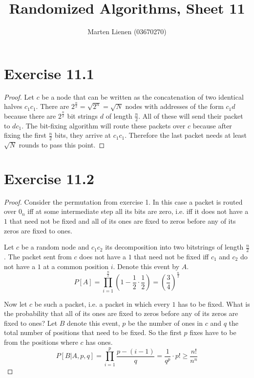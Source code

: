 \documentclass[10pt,a4paper]{article}
\title{Randomized Algorithms, Sheet 11}
\author{Marten Lienen (03670270)}
\begin{document}
\maketitle

\section*{Exercise 11.1}

\begin{proof}
  Let $c$ be a node that can be written as the concatenation of two identical halves $c_{1}c_{1}$.
  There are $2^{\frac{n}{2}} = \sqrt{2^{n}} = \sqrt{N}$ nodes with addresses of the form $c_{1}d$ because there are $2^{\frac{n}{2}}$ bit strings $d$ of length $\frac{n}{2}$.
  All of these will send their packet to $dc_{1}$.
  The bit-fixing algorithm will route these packets over $c$ because after fixing the first $\frac{n}{2}$ bits, they arrive at $c_{1}c_{1}$.
  Therefore the last packet needs at least $\sqrt{N}$ rounds to pass this point.
\end{proof}

\section*{Exercise 11.2}

\begin{proof}
  Consider the permutation from exercise 1.
  In this case a packet is routed over $0_{n}$ iff at some intermediate step all its bits are zero, i.e. iff it does not have a $1$ that need not be fixed and all of its ones are fixed to zeros before any of its zeros are fixed to ones.

  Let $c$ be a random node and $c_{1}c_{2}$ its decomposition into two bitstrings of length $\frac{n}{2}$.
  The packet sent from $c$ does not have a $1$ that need not be fixed iff $c_{1}$ and $c_{2}$ do not have a $1$ at a common position $i$.
  Denote this event by $A$.
  \begin{equation*}
    P[A] = \prod_{i = 1}^{\frac{n}{2}} \left( 1 - \frac{1}{2} \cdot \frac{1}{2} \right) = \left( \frac{3}{4} \right)^{\frac{n}{2}}
  \end{equation*}

  Now let $c$ be such a packet, i.e. a packet in which every $1$ has to be fixed.
  What is the probability that all of its ones are fixed to zeros before any of its zeros are fixed to ones?
  Let $B$ denote this event, $p$ be the number of ones in $c$ and $q$ the total number of positions that need to be fixed.
  So the first $p$ fixes have to be from the positions where $c$ has ones.
  \begin{equation*}
    P[B | A, p, q] = \prod_{i = 1}^{p} \frac{p - (i - 1)}{q} = \frac{1}{q^{p}} \cdot p! \ge \frac{n!}{n^{n}}
  \end{equation*}
\end{proof}
\end{document}
